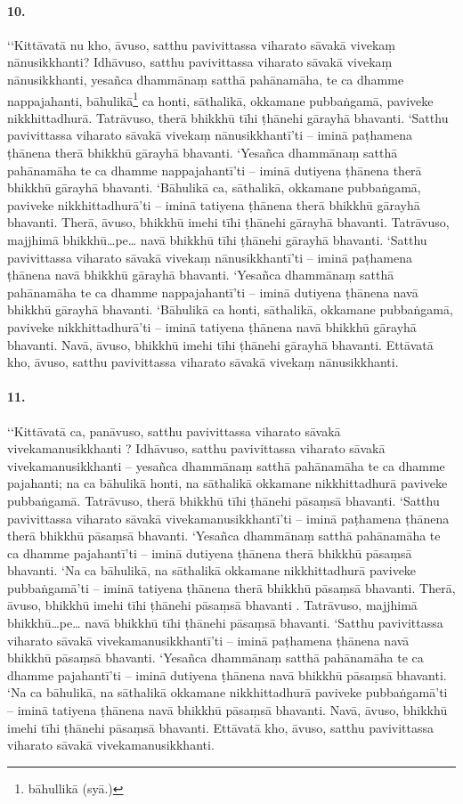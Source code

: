 \paragraph{10.} ‘‘Kittāvatā nu kho, āvuso, satthu pavivittassa viharato sāvakā vivekaṃ nānusikkhanti? Idhāvuso, satthu pavivittassa viharato sāvakā vivekaṃ nānusikkhanti, yesañca dhammānaṃ satthā pahānamāha, te ca dhamme nappajahanti, bāhulikā\footnote{bāhullikā (syā.)} ca honti, sāthalikā, okkamane pubbaṅgamā, paviveke nikkhittadhurā. Tatrāvuso, therā bhikkhū tīhi ṭhānehi gārayhā bhavanti. ‘Satthu pavivittassa viharato sāvakā vivekaṃ nānusikkhantī’ti – iminā paṭhamena ṭhānena therā bhikkhū gārayhā bhavanti. ‘Yesañca dhammānaṃ satthā pahānamāha te ca dhamme nappajahantī’ti – iminā dutiyena ṭhānena therā bhikkhū gārayhā bhavanti. ‘Bāhulikā ca, sāthalikā, okkamane pubbaṅgamā, paviveke nikkhittadhurā’ti – iminā tatiyena ṭhānena therā bhikkhū gārayhā bhavanti. Therā, āvuso, bhikkhū imehi tīhi ṭhānehi gārayhā bhavanti. Tatrāvuso, majjhimā bhikkhū…pe… navā bhikkhū tīhi ṭhānehi gārayhā bhavanti. ‘Satthu pavivittassa viharato sāvakā vivekaṃ nānusikkhantī’ti – iminā paṭhamena ṭhānena navā bhikkhū gārayhā bhavanti. ‘Yesañca dhammānaṃ satthā pahānamāha te ca dhamme nappajahantī’ti – iminā dutiyena ṭhānena navā bhikkhū gārayhā bhavanti. ‘Bāhulikā ca honti, sāthalikā, okkamane pubbaṅgamā, paviveke nikkhittadhurā’ti – iminā tatiyena ṭhānena navā bhikkhū gārayhā bhavanti. Navā, āvuso, bhikkhū imehi tīhi ṭhānehi gārayhā bhavanti. Ettāvatā kho, āvuso, satthu pavivittassa viharato sāvakā vivekaṃ nānusikkhanti.

\paragraph{11.} ‘‘Kittāvatā ca, panāvuso, satthu pavivittassa viharato sāvakā vivekamanusikkhanti ? Idhāvuso, satthu pavivittassa viharato sāvakā vivekamanusikkhanti – yesañca dhammānaṃ satthā pahānamāha te ca dhamme pajahanti; na ca bāhulikā honti, na sāthalikā okkamane nikkhittadhurā paviveke pubbaṅgamā. Tatrāvuso, therā bhikkhū tīhi ṭhānehi pāsaṃsā bhavanti. ‘Satthu pavivittassa viharato sāvakā vivekamanusikkhantī’ti – iminā paṭhamena ṭhānena therā bhikkhū pāsaṃsā bhavanti. ‘Yesañca dhammānaṃ satthā pahānamāha te ca dhamme pajahantī’ti – iminā dutiyena ṭhānena therā bhikkhū pāsaṃsā bhavanti. ‘Na ca bāhulikā, na sāthalikā okkamane nikkhittadhurā paviveke pubbaṅgamā’ti – iminā tatiyena ṭhānena therā bhikkhū pāsaṃsā bhavanti. Therā, āvuso, bhikkhū imehi tīhi ṭhānehi pāsaṃsā bhavanti . Tatrāvuso, majjhimā bhikkhū…pe… navā bhikkhū tīhi ṭhānehi pāsaṃsā bhavanti. ‘Satthu pavivittassa viharato sāvakā vivekamanusikkhantī’ti – iminā paṭhamena ṭhānena navā bhikkhū pāsaṃsā bhavanti. ‘Yesañca dhammānaṃ satthā pahānamāha te ca dhamme pajahantī’ti – iminā dutiyena ṭhānena navā bhikkhū pāsaṃsā bhavanti. ‘Na ca bāhulikā, na sāthalikā okkamane nikkhittadhurā paviveke pubbaṅgamā’ti – iminā tatiyena ṭhānena navā bhikkhū pāsaṃsā bhavanti. Navā, āvuso, bhikkhū imehi tīhi ṭhānehi pāsaṃsā bhavanti. Ettāvatā kho, āvuso, satthu pavivittassa viharato sāvakā vivekamanusikkhanti.

